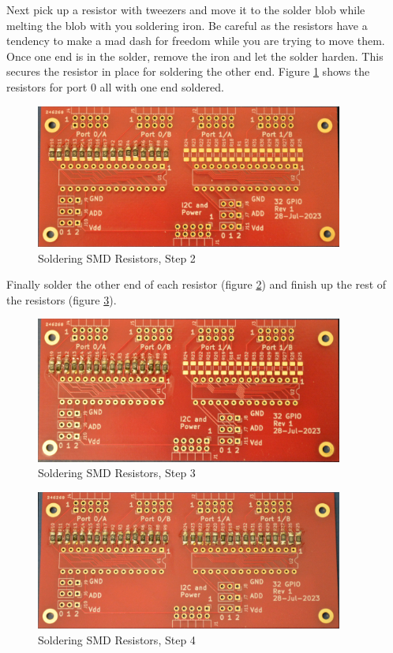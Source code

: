 \documentclass[10pt, openany]{book}
\begin{document}
Next pick up a resistor with tweezers and move it to the solder blob while melting the blob with you soldering iron.  Be careful as the resistors have a tendency to make a mad dash for freedom while you are trying to move them.  Once one end is in the solder, remove the iron and let the solder harden.  This secures the resistor in place for soldering the other end.  Figure \ref{fig:SMD-2} shows the resistors for port 0 all with one end soldered.

\begin{figure}[ht!]
  \centering
  \includegraphics[width=0.9\textwidth]{../Pictures/SMD-2.jpg}
  \caption{Soldering SMD Resistors, Step 2}
  \label{fig:SMD-2}
\end{figure}

Finally solder the other end of each resistor (figure \ref{fig:SMD-3}) and finish up the rest of the resistors (figure \ref{fig:SMD-4}).

\begin{figure}[ht!]
  \centering
  \includegraphics[width=0.9\textwidth]{../Pictures/SMD-3.jpg}
  \caption{Soldering SMD Resistors, Step 3}
  \label{fig:SMD-3}
\end{figure}

\begin{figure}[ht!]
  \centering
  \includegraphics[width=0.9\textwidth]{../Pictures/SMD-4.jpg}
  \caption{Soldering SMD Resistors, Step 4}
  \label{fig:SMD-4}
\end{figure}
\end{document}
